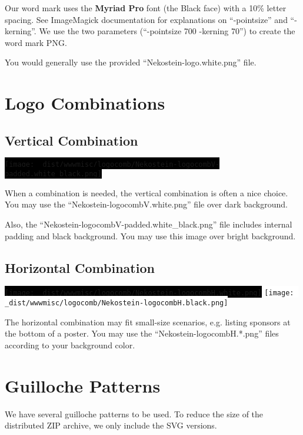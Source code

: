 \documentclass[a4paper,11pt]{report}
\newcommand{\altfbox}[1]{%
    \colorbox{black}{#1}%
}
\begin{document}
Our word mark uses the \textbf{Myriad Pro} font (the Black face) with a 10\% letter spacing.
See ImageMagick documentation for explanations on ``-pointsize'' and ``-kerning''.
We use the two parameters (``-pointsize 700 -kerning 70'') to create the word mark PNG.

You would generally use the provided ``Nekostein-logo.white.png'' file.






\chapter{Logo Combinations}

\section{Vertical Combination}
\altfbox{\texttt{[image: \_dist/wwwmisc/logocomb/Nekostein-logocombV-padded.white\_black.png]}}

When a combination is needed, the vertical combination is often a nice choice.
You may use the ``Nekostein-logocombV.white.png'' file over dark background.

Also, the ``Nekostein-logocombV-padded.white\_black.png'' file includes internal padding and black background.
You may use this image over bright background.

\section{Horizontal Combination}
\altfbox{\texttt{[image: \_dist/wwwmisc/logocomb/Nekostein-logocombH.white.png]}}\hfill%
\colorbox{white}{\texttt{[image: \_dist/wwwmisc/logocomb/Nekostein-logocombH.black.png]}}

The horizontal combination may fit small-size scenarios, e.g. listing sponsors at the bottom of a poster.
You may use the ``Nekostein-logocombH.*.png'' files according to your background color.












\chapter{Guilloche Patterns}
We have several guilloche patterns to be used.
To reduce the size of the distributed ZIP archive, we only include the SVG versions.
\end{document}
